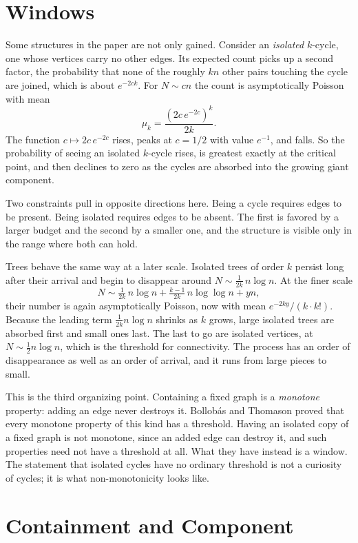 \documentclass[11pt]{article}
\begin{document}
\section{Windows}

Some structures in the paper are not only gained. Consider an \emph{isolated} $k$-cycle, one whose vertices carry no other edges. Its expected count picks up a second factor, the probability that none of the roughly $kn$ other pairs touching the cycle are joined, which is about $e^{-2ck}$. For $N\sim cn$ the count is asymptotically Poisson with mean
\[
\mu_k = \frac{(2c\,e^{-2c})^k}{2k}.
\]
The function $c\mapsto 2c\,e^{-2c}$ rises, peaks at $c = 1/2$ with value $e^{-1}$, and falls. So the probability of seeing an isolated $k$-cycle rises, is greatest exactly at the critical point, and then declines to zero as the cycles are absorbed into the growing giant component.

Two constraints pull in opposite directions here. Being a cycle requires edges to be present. Being isolated requires edges to be absent. The first is favored by a larger budget and the second by a smaller one, and the structure is visible only in the range where both can hold.

Trees behave the same way at a later scale. Isolated trees of order $k$ persist long after their arrival and begin to disappear around $N\sim \frac{1}{2k}\,n\log n$. At the finer scale
\[
N \sim \tfrac{1}{2k}\,n\log n + \tfrac{k-1}{2k}\,n\log\log n + yn,
\]
their number is again asymptotically Poisson, now with mean $e^{-2ky}/(k\cdot k!)$. Because the leading term $\frac{1}{2k}n\log n$ shrinks as $k$ grows, large isolated trees are absorbed first and small ones last. The last to go are isolated vertices, at $N\sim\frac12 n\log n$, which is the threshold for connectivity. The process has an order of disappearance as well as an order of arrival, and it runs from large pieces to small.

This is the third organizing point. Containing a fixed graph is a \emph{monotone} property: adding an edge never destroys it. Bollob\'as and Thomason proved that every monotone property of this kind has a threshold. Having an isolated copy of a fixed graph is not monotone, since an added edge can destroy it, and such properties need not have a threshold at all. What they have instead is a window. The statement that isolated cycles have no ordinary threshold is not a curiosity of cycles; it is what non-monotonicity looks like.

\section{Containment and Component}
\end{document}
